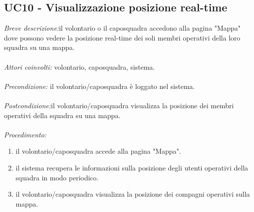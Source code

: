 \subsection{UC10 - Visualizzazione posizione real-time}
\textit{Breve descrizione:}il volontario o il caposquadra accedono alla pagina "Mappa" dove possono vedere la posizione real-time dei soli membri operativi della loro squadra su una mappa. 
\\
\\
\textit{Attori coinvolti:} volontario, caposquadra, sistema.
\\
\\
\textit{Precondizione:} il volontario/caposquadra è loggato nel sistema.
\\
\\
\textit{Postcondizione:}il volontario/caposquadra visualizza la posizione dei membri operativi della squadra su una mappa.
\\
\\
\textit{Procedimento:}
\begin{enumerate}
	\item il volontario/caposquadra accede alla pagina "Mappa".
	\item il sistema recupera le informazioni sulla posizione degli utenti operativi della squadra in modo periodico.
	\item il volontario/caposquadra visualizza la posizione dei compagni operativi sulla mappa.
\end{enumerate}